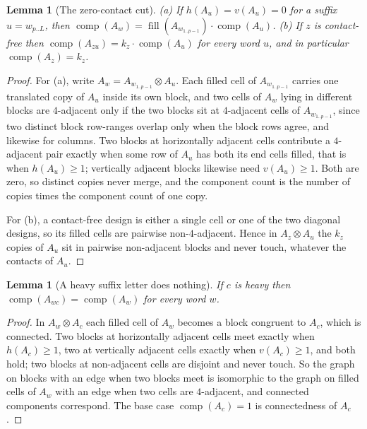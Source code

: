 \documentclass[11pt]{amsart}
\newtheorem{lemma}[theorem]{Lemma}
\theoremstyle{definition}
\theoremstyle{remark}
\DeclareMathOperator{\comp}{comp}
\DeclareMathOperator{\fil}{fill}
\begin{document}
\begin{lemma}[The zero-contact cut]
\label{lem:cut}
\emph{(a)} If $h(A_u) = v(A_u) = 0$ for a suffix $u = w_{p..L}$, then $\comp(A_w) = \fil(A_{w_{1..p-1}}) \cdot \comp(A_u)$. \emph{(b)} If $z$ is contact-free then $\comp(A_{zu}) = k_z \cdot \comp(A_u)$ for every word $u$, and in particular $\comp(A_z) = k_z$.
\end{lemma}

\begin{proof}
For (a), write $A_w = A_{w_{1..p-1}} \otimes A_u$. Each filled cell of $A_{w_{1..p-1}}$ carries one translated copy of $A_u$ inside its own block, and two cells of $A_w$ lying in different blocks are $4$-adjacent only if the two blocks sit at $4$-adjacent cells of $A_{w_{1..p-1}}$, since two distinct block row-ranges overlap only when the block rows agree, and likewise for columns. Two blocks at horizontally adjacent cells contribute a $4$-adjacent pair exactly when some row of $A_u$ has both its end cells filled, that is when $h(A_u) \ge 1$; vertically adjacent blocks likewise need $v(A_u) \ge 1$. Both are zero, so distinct copies never merge, and the component count is the number of copies times the component count of one copy.

For (b), a contact-free design is either a single cell or one of the two diagonal designs, so its filled cells are pairwise non-$4$-adjacent. Hence in $A_z \otimes A_u$ the $k_z$ copies of $A_u$ sit in pairwise non-adjacent blocks and never touch, whatever the contacts of $A_u$.
\end{proof}

\begin{lemma}[A heavy suffix letter does nothing]
\label{lem:heavy}
If $c$ is heavy then $\comp(A_{wc}) = \comp(A_w)$ for every word $w$.
\end{lemma}

\begin{proof}
In $A_w \otimes A_c$ each filled cell of $A_w$ becomes a block congruent to $A_c$, which is connected. Two blocks at horizontally adjacent cells meet exactly when $h(A_c) \ge 1$, two at vertically adjacent cells exactly when $v(A_c) \ge 1$, and both hold; two blocks at non-adjacent cells are disjoint and never touch. So the graph on blocks with an edge when two blocks meet is isomorphic to the graph on filled cells of $A_w$ with an edge when two cells are $4$-adjacent, and connected components correspond. The base case $\comp(A_c) = 1$ is connectedness of $A_c$.
\end{proof}
\end{document}
